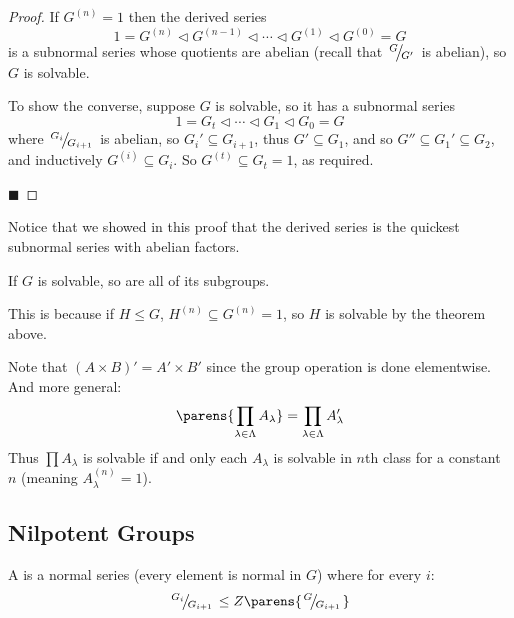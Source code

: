 \documentclass[10pt]{article}
\def\slfrac#1#2{\left.{}^{#1}\mkern-4mu\middle/\mkern-3mu{}_{#2}\right.}
\def\normal{\mathrel\triangleleft}
\begin{document}
\begin{proof}

    If $G^{(n)}=1$ then the derived series
    \[ 1 = G^{(n)} \normal G^{(n-1)} \normal \cdots \normal G^{(1)} \normal G^{(0)} = G \]
    is a subnormal series whose quotients are abelian (recall that $\slfrac{G}{G'}$ is abelian), so $G$ is solvable.

    To show the converse, suppose $G$ is solvable, so it has a subnormal series
    \[ 1 = G_t \normal \cdots \normal G_1 \normal G_0 = G \]
    where $\slfrac{G_i}{G_{i+1}}$ is abelian, so $G_i'\subseteq G_{i+1}$, thus $G'\subseteq G_1$, and so $G''\subseteq G_1'\subseteq G_2$, and inductively $G^{(i)}\subseteq G_i$.
    So $G^{(t)}\subseteq G_t=1$, as required.

    \hfill$\blacksquare$

\end{proof}

Notice that we showed in this proof that the derived series is the quickest subnormal series with abelian factors.

\begin{coro*}

    If $G$ is solvable, so are all of its subgroups.

\end{coro*}

This is because if $H\leq G$, $H^{(n)}\subseteq G^{(n)}=1$, so $H$ is solvable by the theorem above.

Note that $(A\times B)'=A'\times B'$ since the group operation is done elementwise.
And more general:
\[ \parens{\prod_{\lambda\in\Lambda}A_\lambda} = \prod_{\lambda\in\Lambda}A_\lambda' \]
Thus $\prod A_\lambda$ is solvable if and only each $A_\lambda$ is solvable in $n$th class for a constant $n$ (meaning $A_\lambda^{(n)}=1$).

\subsection{Nilpotent Groups}

\begin{defn*}

    A  is a normal series (every element is normal in $G$) where for every $i$:
    \[ \slfrac{G_i}{G_{i+1}} \leq Z\parens{\slfrac{G}{G_{i+1}}} \]

\end{defn*}
\end{document}
